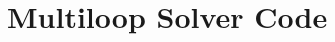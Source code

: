 \documentclass[hidelinks]{article}
\begin{document}
    \FloatBarrier\section*{Multiloop Solver Code}
    
    \inputminted[python3=true]{python}{../code/main.py}

\end{document}

